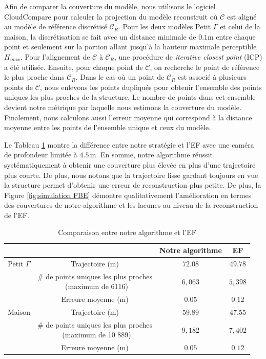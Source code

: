 Afin de comparer la couverture du modèle, nous utilisons le logiciel CloudCompare pour calculer la projection du modèle reconstruit où $\mathcal C$ est aligné au modèle de référence discrétisé $\mathcal C_R$. Pour les deux modèles Petit $\Gamma$ et celui de la maison, la discrétisation se fait avec un distance minimale de $0.1$m entre chaque point et seulement sur la portion allant jusqu'à la hauteur maximale perceptible $H_{max}$. Pour l'alignement de $\mathcal C$  à $\mathcal C_R$, une procédure de \textit{iterative closest point} (ICP) \citep{Rusinkiewicz2001} a été utilisée. Ensuite, pour chaque point de $\mathcal C$, on recherche le point de référence le plus proche dans $\mathcal C_R$. Dans le cas où un point de $\mathcal C_R$ est associé à plusieurs points de $\mathcal C$, nous enlevons les points dupliqués pour obtenir l'ensemble des points uniques les plus proches de la structure. Le nombre de points dans cet ensemble devient notre métrique par laquelle nous estimons la couverture du modèle. Finalement, nous calculons aussi l'erreur moyenne qui correspond à la distance moyenne entre les points de l'ensemble unique et ceux du modèle.

Le Tableau \ref{tbl: simulation results 3} montre la différence entre notre stratégie et l'EF avec une caméra de profondeur limitée à $4.5\, \mathrm{m}$. En somme, notre algorithme réussit systématiquement à obtenir une couverture plus élevée en plus d'une trajectoire plus courte. De plus, nous notons que la trajectoire lisse gardant toujours en vue la structure permet d'obtenir une erreur de reconstruction plus petite. De plus, la Figure \ref{fig:simulation FBE} démontre qualitativement l'amélioration en termes des couvertures de notre algorithme et les lacunes au niveau de la reconstruction de l'EF.

\begin{table}[!ht]
\renewcommand{\arraystretch}{1.3}
\caption{Comparaison entre notre algorithme et l'EF}
\label{tbl: simulation results 3}
\centering
\begin{tabular}{|c|c|c|c|}
\cline{3-4}
\multicolumn{2}{c|}{} & Notre algorithme & EF \\
\hline
{Petit $\Gamma$} & Trajectoire (m)            & $72.08$  & $49.78$  \\\cline{2-4}
								& \specialcell{\# de points uniques les plus proches \\ (maximum de 6116)} & $6,063$          & $5,398$          \\\cline{2-4}
								& Erreure moyenne (m)             & $0.05$ & $0.12$\\\cline{2-4}
\hline
{Maison} & Trajectoire (m) & $59.89$ & $47.55$ \\\cline{2-4}
					   & \specialcell{\# de points uniques les plus proches \\ (maximum de 10 889)} & $9,182$ & $7,402$ \\\cline{2-4}
					   &  Erreure moyenne (m)             & $0.05$ & $0.12$\\\cline{2-4}
\hline
\end{tabular}
\end{table}


